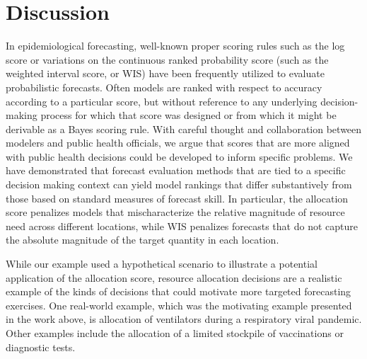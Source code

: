 \documentclass{article}\usepackage[]{graphicx}\usepackage[]{xcolor}
\begin{document}
\section{Discussion}
\label{sec:discussion}

In epidemiological forecasting, well-known proper scoring rules such as the log score or variations on the continuous ranked probability score (such as the weighted interval score, or WIS) have been frequently utilized to evaluate probabilistic forecasts.
Often models are ranked with respect to accuracy according to a particular score, but without reference to any underlying decision-making process for which that score was designed or from which it might be derivable as a Bayes scoring rule.
With careful thought and collaboration between modelers and public health officials, we argue that scores that are more aligned with public health decisions could be developed to inform specific problems.
We have demonstrated that forecast evaluation methods that are tied to a specific decision making context can yield model rankings that differ substantively from those based on standard measures of forecast skill.
In particular, the allocation score penalizes models that mischaracterize the relative magnitude of resource need across different locations, while WIS penalizes forecasts that do not capture the absolute magnitude of the target quantity in each location.


While our example used a hypothetical scenario to illustrate a potential application of the allocation score, resource allocation decisions are a realistic example of the kinds of decisions that could motivate more targeted forecasting exercises.
One real-world example, which was the motivating example presented in the work above, is allocation of ventilators during a respiratory viral pandemic\citep{huang_stockpiling_2017}.
Other examples include the allocation of a limited stockpile of vaccinations\citep{araz_geographic_2012,persad_fair_2023} or diagnostic tests\citep{du_optimal_2022,pasco_covid-19_2023}.
\end{document}
